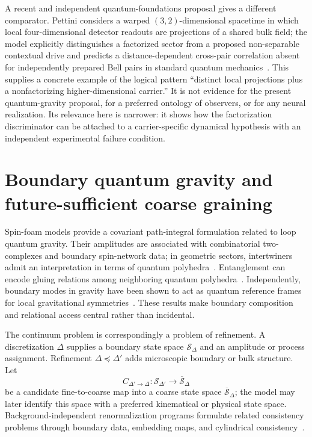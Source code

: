 \documentclass[11pt]{article}
\newcommand{\Sspace}{\mathcal S}
\begin{document}
A recent and independent quantum-foundations proposal gives a different comparator. Pettini considers a warped $(3,2)$-dimensional spacetime in which local four-dimensional detector readouts are projections of a shared bulk field; the model explicitly distinguishes a factorized sector from a proposed non-separable contextual drive and predicts a distance-dependent cross-pair correlation absent for independently prepared Bell pairs in standard quantum mechanics~\cite{pettini2026}. This supplies a concrete example of the logical pattern ``distinct local projections plus a nonfactorizing higher-dimensional carrier.'' It is not evidence for the present quantum-gravity proposal, for a preferred ontology of observers, or for any neural realization. Its relevance here is narrower: it shows how the factorization discriminator can be attached to a carrier-specific dynamical hypothesis with an independent experimental failure condition.

\section{Boundary quantum gravity and future-sufficient coarse graining}
\label{sec:qg}

Spin-foam models provide a covariant path-integral formulation related to loop quantum gravity. Their amplitudes are associated with combinatorial two-complexes and boundary spin-network data; in geometric sectors, intertwiners admit an interpretation in terms of quantum polyhedra~\cite{perez2013,eprl2008,freidelkrasnov2008,bianchi2011}. Entanglement can encode gluing relations among neighboring quantum polyhedra~\cite{baytas2018}. Independently, boundary modes in gravity have been shown to act as quantum reference frames for local gravitational symmetries~\cite{kabel2023}. These results make boundary composition and relational access central rather than incidental.

The continuum problem is correspondingly a problem of refinement. A discretization $\Delta$ supplies a boundary state space $\Sspace_{\Delta}$ and an amplitude or process assignment. Refinement $\Delta\preceq\Delta'$ adds microscopic boundary or bulk structure. Let
\begin{equation}
  C_{\Delta'\to\Delta}:\Sspace_{\Delta'}\to\overline{\Sspace}_{\Delta}
  \label{eq:qg-coarse-map}
\end{equation}
be a candidate fine-to-coarse map into a coarse state space $\overline{\Sspace}_{\Delta}$; the model may later identify this space with a preferred kinematical or physical state space. Background-independent renormalization programs formulate related consistency problems through boundary data, embedding maps, and cylindrical consistency~\cite{dittrich2012,dittrichsteinhaus2014,steinhaus2020}.
\end{document}
